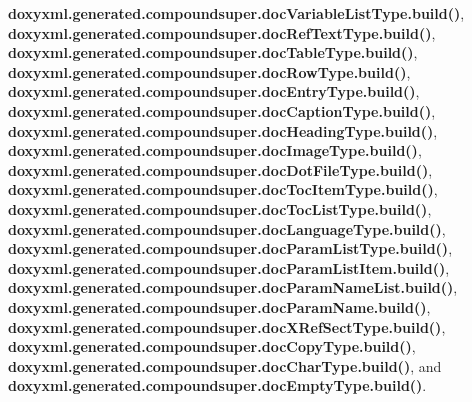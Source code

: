 {\bf doxyxml.\+generated.\+compoundsuper.\+doc\+Variable\+List\+Type.\+build()}, {\bf doxyxml.\+generated.\+compoundsuper.\+doc\+Ref\+Text\+Type.\+build()}, {\bf doxyxml.\+generated.\+compoundsuper.\+doc\+Table\+Type.\+build()}, {\bf doxyxml.\+generated.\+compoundsuper.\+doc\+Row\+Type.\+build()}, {\bf doxyxml.\+generated.\+compoundsuper.\+doc\+Entry\+Type.\+build()}, {\bf doxyxml.\+generated.\+compoundsuper.\+doc\+Caption\+Type.\+build()}, {\bf doxyxml.\+generated.\+compoundsuper.\+doc\+Heading\+Type.\+build()}, {\bf doxyxml.\+generated.\+compoundsuper.\+doc\+Image\+Type.\+build()}, {\bf doxyxml.\+generated.\+compoundsuper.\+doc\+Dot\+File\+Type.\+build()}, {\bf doxyxml.\+generated.\+compoundsuper.\+doc\+Toc\+Item\+Type.\+build()}, {\bf doxyxml.\+generated.\+compoundsuper.\+doc\+Toc\+List\+Type.\+build()}, {\bf doxyxml.\+generated.\+compoundsuper.\+doc\+Language\+Type.\+build()}, {\bf doxyxml.\+generated.\+compoundsuper.\+doc\+Param\+List\+Type.\+build()}, {\bf doxyxml.\+generated.\+compoundsuper.\+doc\+Param\+List\+Item.\+build()}, {\bf doxyxml.\+generated.\+compoundsuper.\+doc\+Param\+Name\+List.\+build()}, {\bf doxyxml.\+generated.\+compoundsuper.\+doc\+Param\+Name.\+build()}, {\bf doxyxml.\+generated.\+compoundsuper.\+doc\+X\+Ref\+Sect\+Type.\+build()}, {\bf doxyxml.\+generated.\+compoundsuper.\+doc\+Copy\+Type.\+build()}, {\bf doxyxml.\+generated.\+compoundsuper.\+doc\+Char\+Type.\+build()}, and {\bf doxyxml.\+generated.\+compoundsuper.\+doc\+Empty\+Type.\+build()}.



